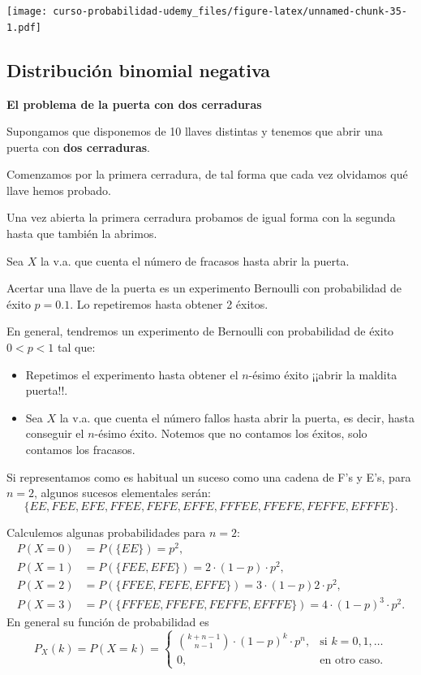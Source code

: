 \documentclass[]{book}
\providecommand{\tightlist}{%
  \setlength{\itemsep}{0pt}\setlength{\parskip}{0pt}}
\begin{document}
\texttt{[image: curso-probabilidad-udemy\_files/figure-latex/unnamed-chunk-35-1.pdf]}

\hypertarget{distribuciuxf3n-binomial-negativa}{%
\subsection{Distribución binomial negativa}\label{distribuciuxf3n-binomial-negativa}}

\textbf{El problema de la puerta con dos cerraduras}

Supongamos que disponemos de 10 llaves distintas y tenemos que abrir una puerta con \textbf{dos cerraduras}.

Comenzamos por la primera cerradura, de tal forma que cada vez olvidamos qué llave hemos probado.

Una vez abierta la primera cerradura probamos de igual forma con la segunda hasta que también la abrimos.

Sea \(X\) la v.a. que cuenta el número de fracasos hasta abrir la puerta.

Acertar una llave de la puerta es un experimento Bernoulli con probabilidad de éxito \(p=0.1\). Lo repetiremos hasta obtener 2 éxitos.

En general, tendremos un experimento de Bernoulli con probabilidad de éxito \(0<p<1\) tal que:

\begin{itemize}
\tightlist
\item
  Repetimos el experimento hasta obtener el \(n\)-ésimo éxito ¡¡abrir la maldita puerta!!.
\item
  Sea \(X\) la v.a. que cuenta el número fallos hasta abrir la puerta, es decir, hasta conseguir el \(n\)-ésimo éxito. Notemos que no contamos los éxitos, solo contamos los fracasos.
\end{itemize}

Si representamos como es habitual un suceso como una cadena de F's y E's, para \(n=2\), algunos sucesos elementales serán:
\[\{EE,FEE,EFE, FFEE,FEFE,EFFE,FFFEE,FFEFE,FEFFE,EFFFE\}.\]

Calculemos algunas probabilidades para \(n=2\):
\[
\begin{array}{rl}
P(X=0) & =P(\{EE\})=p^2, \\
P(X=1) & =P(\{FEE,EFE\})=2\cdot (1-p)\cdot p^2, \\
P(X=2) & =P(\{FFEE,FEFE,EFFE\})=3\cdot (1-p) 2\cdot p^2, \\
P(X=3) & =P(\{FFFEE,FFEFE,FEFFE,EFFFE\})=4\cdot (1-p)^3\cdot p^2.
\end{array}
\]
En general su función de probabilidad es
\[
P_{X}(k)=P(X=k)=\left\{\begin{array}{ll}
     {{k+n-1}\choose{n-1}} \cdot (1-p)^{k}\cdot p^n, & \mbox{si } k=0,1,\ldots\\
     0, & \mbox{en otro caso.}\end{array}\right.
\]
\end{document}
